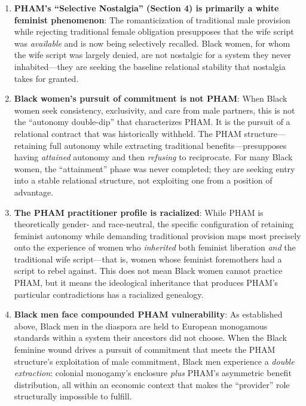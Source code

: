 \documentclass[12pt, letterpaper]{article}
\begin{document}
\begin{enumerate}
    \item \textbf{PHAM's ``Selective Nostalgia'' (Section 4) is primarily a white feminist phenomenon}: The romanticization of traditional male provision while rejecting traditional female obligation presupposes that the wife script was \textit{available} and is now being selectively recalled. Black women, for whom the wife script was largely denied, are not nostalgic for a system they never inhabited---they are seeking the baseline relational stability that nostalgia takes for granted.
    
    \item \textbf{Black women's pursuit of commitment is not PHAM}: When Black women seek consistency, exclusivity, and care from male partners, this is not the ``autonomy double-dip'' that characterizes PHAM. It is the pursuit of a relational contract that was historically withheld. The PHAM structure---retaining full autonomy while extracting traditional benefits---presupposes having \textit{attained} autonomy and then \textit{refusing} to reciprocate. For many Black women, the ``attainment'' phase was never completed; they are seeking entry into a stable relational structure, not exploiting one from a position of advantage.
    
    \item \textbf{The PHAM practitioner profile is racialized}: While PHAM is theoretically gender- and race-neutral, the specific configuration of retaining feminist autonomy while demanding traditional provision maps most precisely onto the experience of women who \textit{inherited} both feminist liberation \textit{and} the traditional wife script---that is, women whose feminist foremothers had a script to rebel against. This does not mean Black women cannot practice PHAM, but it means the ideological inheritance that produces PHAM's particular contradictions has a racialized genealogy.
    
    \item \textbf{Black men face compounded PHAM vulnerability}: As established above, Black men in the diaspora are held to European monogamous standards within a system their ancestors did not choose. When the Black feminine wound drives a pursuit of commitment that meets the PHAM structure's exploitation of male commitment, Black men experience a \textit{double extraction}: colonial monogamy's enclosure \textit{plus} PHAM's asymmetric benefit distribution, all within an economic context that makes the ``provider'' role structurally impossible to fulfill.
\end{enumerate}
\end{document}
